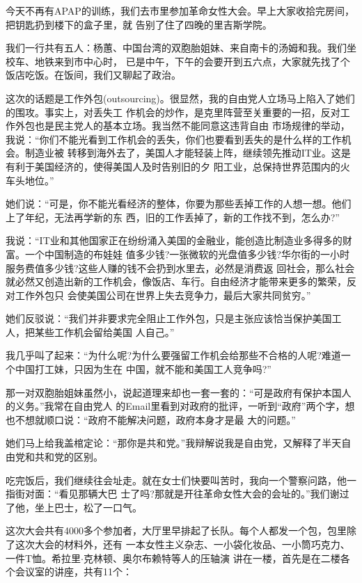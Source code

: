 ﻿\documentclass[11pt]{article}
\begin{document}
今天不再有APAP的训练，我们去市里参加革命女性大会。早上大家收拾完房间，把钥匙扔到楼下的盒子里，就
告别了住了四晚的里吉斯学院。

我们一行共有五人：杨蕙、中国台湾的双胞胎姐妹、来自南卡的汤姆和我。我们坐校车、地铁来到市中心时，
已是中午，下午的会要开到五六点，大家就先找了个饭店吃饭。在饭间，我们又聊起了政治。

这次的话题是工作外包(outsourcing)。很显然，我的自由党人立场马上陷入了她们的围攻。事实上，对丢失工
作机会的炒作，是克里阵营至关重要的一招，反对工作外包也是民主党人的基本立场。我当然不能同意这违背自由
市场规律的举动，我说：``你们不能光看到工作机会的丢失，你们也要看到丢失的是什么样的工作机会。制造业被
转移到海外去了，美国人才能轻装上阵，继续领先推动IT业。这是有利于美国经济的，使得美国人及时告别旧的夕
阳工业，总保持世界范围内的火车头地位。''

她们说：``可是，你不能光看经济的整体，你要为那些丢掉工作的人想一想。他们上了年纪，无法再学新的东
西，旧的工作丢掉了，新的工作找不到，怎么办?''

我说：``IT业和其他国家正在纷纷涌入美国的金融业，能创造比制造业多得多的财富。一个中国制造的布娃娃
值多少钱?一张微软的光盘值多少钱?华尔街的一小时服务费值多少钱?这些人赚的钱不会扔到水里去，必然是消费返
回社会，那么社会就必然又创造出新的工作机会，像饭店、车行。自由经济才能带来更多的繁荣，反对工作外包只
会使美国公司在世界上失去竞争力，最后大家共同贫穷。''

她们反驳说：``我们并非要求完全阻止工作外包，只是主张应该恰当保护美国工人，把某些工作机会留给美国
人自己。''

我几乎叫了起来：``为什么呢?为什么要强留工作机会给那些不合格的人呢?难道一个中国打工妹，只因为生在
中国，就不能和美国工人竞争吗?''

那一对双胞胎姐妹虽然小，说起道理来却也一套一套的：``可是政府有保护本国人的义务。''我常在自由党人
的Email里看到对政府的批评，一听到``政府''两个字，想也不想就顺口说：``政府不能解决问题，政府本身才是最
大的问题。''

她们马上给我盖棺定论：``那你是共和党。''我辩解说我是自由党，又解释了半天自由党和共和党的区别。

吃完饭后，我们继续往会址走。就在女士们快要叫苦时，我向一个警察问路，他一指街对面：``看见那辆大巴
士了吗?那就是开往革命女性大会的会址的。''我们谢过了他，坐上巴士，松了一口气。

这次大会共有4000多个参加者，大厅里早排起了长队。每个人都发一个包，包里除了这次大会的材料外，还有
一本女性主义杂志、一小袋化妆品、一小筒巧克力、一件T恤。希拉里$\cdot$克林顿、奥尔布赖特等人的压轴演
讲在一楼，首先是在二楼各个会议室的讲座，共有11个：
\end{document}
